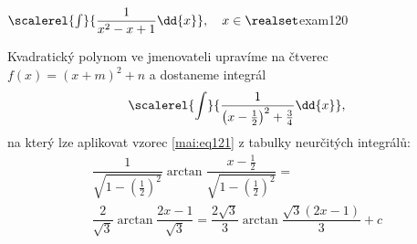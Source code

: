 \begin{mathexam}{\(\protect\scalerel{\int}{\dfrac{1}{x^2 - x + 1}\dd{x}},\quad
  x\in\realset\)}{exam120} 
  
  Kvadratický polynom ve jmenovateli upravíme na čtverec \(f(x) = (x + m)^2 + n\) a dostaneme
  integrál\[\scalerel{\int}{\dfrac{1}{\left(x-\frac{1}{2}\right)^2+\frac{3}{4}}\dd{x}},\] na který
  lze aplikovat vzorec \ref{mai:eq121} z tabulky neurčitých integrálů: 
  \begin{multline*}
    \dfrac{1}{\sqrt{1-\left(\frac{1}{2}\right)^2}}\arctan
    \dfrac{x-\frac{1}{2}}{\sqrt{1-\left(\frac{1}{2}\right)^2}} = \\
    \dfrac{2}{\sqrt{3}}\arctan\dfrac{2x-1}{\sqrt{3}}  =
    \dfrac{2\sqrt{3}}{3}\arctan\dfrac{\sqrt{3}(2x-1)}{3} + c
  \end{multline*}
\end{mathexam}